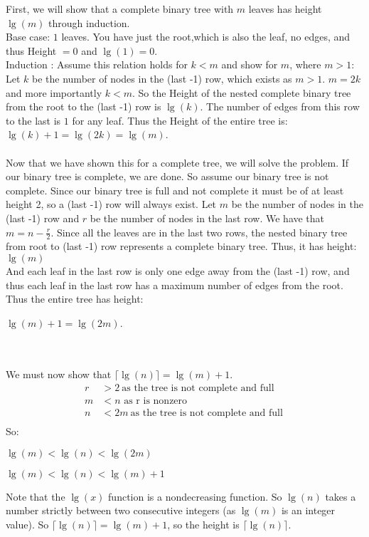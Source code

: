 \documentclass[12pt]{article}
\begin{document}
First, we will show that a complete binary tree with $m$ leaves has height $ \lg(m)$ through induction.\\
Base case: $1$ leaves.  You have just the root,which is also the leaf, no edges, and thus Height $ = 0$ and $\lg(1) = 0$.\\
Induction : Assume this relation holds for $k < m$ and show for $m$, where $m >1$:
Let $k$ be the number of nodes in the (last -1) row, which exists as $m >1$.  $m = 2k$ and more importantly $k < m$.  So the Height of the nested complete binary tree from the root to
the (last -1) row is $\lg(k)$.  The number of edges from this row to the last is $1$ for any leaf.  Thus the Height of the entire tree is:\\
$\lg(k) + 1 = \lg(2k) = \lg(m)$.\\
\\
Now that we have shown this for a complete tree, we will solve the problem.
If our binary tree is complete, we are done.
So assume our binary tree is not complete.  Since our binary tree is full and not complete it must be of at least height 2, so a (last -1) row will always exist.  Let $m$ be the number of nodes in the (last -1) row and $r$ be the number of nodes in the last row.  
We have that $m = n - \frac{r}{2}$.  Since all the leaves are in the last two rows, the nested binary tree from root to (last -1) row represents a complete binary tree.
Thus, it has height: $\lg( m)$ \\
And each leaf in the last row is only one edge away from the (last -1) row, and thus each leaf in the last row has a maximum number of edges from the root.  Thus the entire tree has height:\\
\centerline{ $\lg(m) +1 = \lg(2m)$.}\\
\\
We must now show that  $\lceil \lg(n) \rceil = \lg(m)+1$.\\
\begin{align*}
r & > 2 ~ \text{as the tree is not complete and full}\ \\
m & < n \text{ as r is nonzero}\ \\
n & <2m ~ \text{as the tree is not complete and full}\ \\
\end{align*}
So:\\
\centerline{$ \lg(m) < \lg(n) < \lg(2m)$ }
\centerline{$ \lg(m) < \lg(n) < \lg(m) +1 $}

Note that the $\lg(x)$ function is a nondecreasing function.  So $\lg(n)$ takes a number strictly between two consecutive integers (as $\lg(m)$ is an integer value).  
So $\lceil \lg(n) \rceil  = \lg(m) +1 $, so the height is  $\lceil \lg(n) \rceil $.
\end{document}
